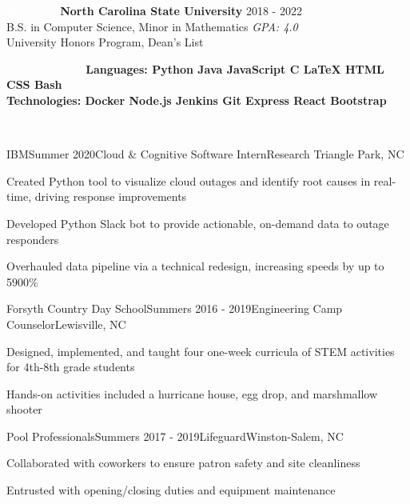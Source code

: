 \documentclass{resume} %
\begin{document}
\setlength\fboxsep{0.33em}

\begin{rSection}{\colorbox{NCSURED}{\textcolor{WHITE}{Education}}}
{\bf North Carolina State University} \hfill {2018 - 2022} \\ 
B.S. in Computer Science, Minor in Mathematics \hfill {\em GPA: 4.0}\\
University Honors Program, Dean's List

\end{rSection}


\begin{rSection}{\colorbox{NCSURED}{\textcolor{WHITE}{Technical Skills}}}
	\textbf{
		{Languages:}
		{ Python} \textbar
		{ Java} \textbar
		{ JavaScript} \textbar
		{ C} \textbar
		{ \LaTeX} \textbar
		{ HTML} \textbar
		{ CSS} \textbar
		{ Bash} \\
		{Technologies:}
		{ Docker} \textbar
		{ Node.js} \textbar
		{ Jenkins} \textbar
		{ Git} \textbar
		{ Express} \textbar
		{ React} \textbar
		{ Bootstrap}
	}	
\end{rSection}


\begin{rSection}{\colorbox{NCSURED}{\textcolor{WHITE}{Experience}}}
	\begin{rSubsection}{IBM}{Summer 2020}{Cloud \& Cognitive Software Intern}{Research Triangle Park, NC}
		\item Created Python tool to visualize cloud outages and identify root causes in real-time, driving response improvements
		\item Developed Python Slack bot to provide actionable, on-demand data to outage responders
		\item Overhauled data pipeline via a technical redesign, increasing speeds by up to 5900\%
	\end{rSubsection}

	\begin{rSubsection}{Forsyth Country Day School}{Summers 2016 - 2019}{Engineering Camp Counselor}{Lewisville, NC}
		\item Designed, implemented, and taught four one-week curricula of STEM activities for 4th-8th grade students
		\item Hands-on activities included a hurricane house, egg drop, and marshmallow shooter
	\end{rSubsection}

	\begin{rSubsection}{Pool Professionals}{Summers 2017 - 2019}{Lifeguard}{Winston-Salem, NC}
		\item Collaborated with coworkers to ensure patron safety and site cleanliness
		\item Entrusted with opening/closing duties and equipment maintenance  
	\end{rSubsection}	
\end{rSection}
\end{document}
